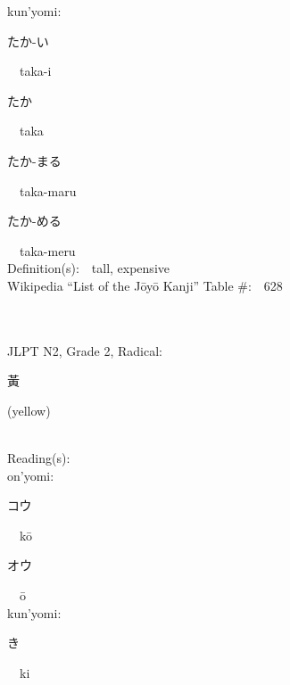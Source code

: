 \begin{multicols}{2}
{\hspace*{1em}}kun'yomi:\ \ \\
{\hspace*{2em}}{\begin{CJK}{UTF8}{min} たか-い \end{CJK}}\ \ taka-i\ \ \\
{\hspace*{2em}}{\begin{CJK}{UTF8}{min} たか \end{CJK}}\ \ taka\ \ \\
{\hspace*{2em}}{\begin{CJK}{UTF8}{min} たか-まる \end{CJK}}\ \ taka-maru\ \ \\
{\hspace*{2em}}{\begin{CJK}{UTF8}{min} たか-める \end{CJK}}\ \ taka-meru\ \ \\
Definition(s):\ \ tall, expensive \\
Wikipedia ``List of the J\=oy\=o Kanji'' Table \#:\ \ 628 \\
\ \ \\
{\fontsize{34pt}{40pt}  }\ \ \\  %
{JLPT N2, Grade 2, Radical:\ \ {\begin{CJK}{UTF8}{min} 黃 \end{CJK}} (yellow) } \\
Reading(s):\ \ \\
{\hspace*{1em}}on'yomi:\ \ \\
{\hspace*{2em}}{\begin{CJK}{UTF8}{min} コウ \end{CJK}}\ \ k\=o\ \ \\
{\hspace*{2em}}{\begin{CJK}{UTF8}{min} オウ \end{CJK}}\ \ \=o\ \ \\
{\hspace*{1em}}kun'yomi:\ \ \\
{\hspace*{2em}}{\begin{CJK}{UTF8}{min} き \end{CJK}}\ \ ki\ \ \\

\end{multicols}
